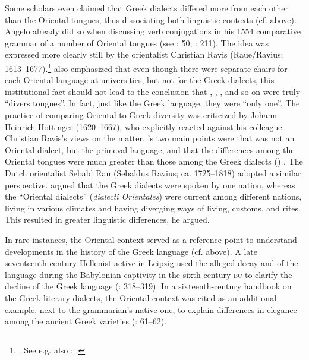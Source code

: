 Some scholars even claimed that Greek dialects differed more from each other than the Oriental tongues, thus dissociating both linguistic contexts (cf.  above). Angelo \citet[34]{Canini1554} already did so when discussing verb conjugations in his 1554 comparative grammar of a number of Oriental tongues (see \citealt{Contini1994}: 50; \citealt{Kessler-mesguich2013}: 211). The idea was expressed more clearly still by the orientalist Christian Ravis (Raue/Ravius; 1613–1677).\footnote{\citet[*.2\textsc{\textsuperscript{r}}]{Ravis1646}. See e.g. also \citet[51--52]{Hunt1739}; \citet[\textsc{xxvi}]{Groddeck1747}.} \citet[48]{Ravis1650} also emphasized that even though there were separate chairs for each Oriental language at universities, but not for the Greek dialects, this institutional fact should not lead to the conclusion that , , , and so on were truly “divers tongues”. In fact, just like the Greek language, they were “only one”. The practice of comparing Oriental to Greek diversity was criticized by Johann Heinrich Hottinger (1620–1667), who explicitly reacted against his colleague Christian Ravis’s views on the matter. \citeauthor{Hottinger1661}'s two main points were that  was not an Oriental dialect, but the primeval language, and that the differences among the Oriental tongues were much greater than those among the Greek dialects (\citeyear[a.3\textsc{\textsuperscript{v}}–a.4\textsc{\textsuperscript{r}}]{Hottinger1661}) . The Dutch orientalist Sebald Rau (Sebaldus Ravius; ca. 1725–1818) adopted a similar perspective. \citet[20--21]{Rau1770} argued that the Greek dialects were spoken by one nation, whereas the “Oriental dialects” (\textit{dialecti Orientales}) were current among different nations, living in various climates and having diverging ways of living, customs, and rites. This resulted in greater linguistic differences, he argued.

In rare instances, the Oriental context served as a reference point to understand developments in the history of the Greek language (cf.  above). A late seventeenth-century Hellenist active in Leipzig used the alleged decay and  of the  language during the Babylonian captivity in the sixth century \textsc{bc} to clarify the decline of the Greek language (\citealt{Eling1691}: 318–319). In a sixteenth-century handbook on the Greek literary dialects, the Oriental context was cited as an additional example, next to the grammarian’s native one, to explain differences in elegance among the ancient Greek varieties (\citealt{Walper1589}: 61–62).

